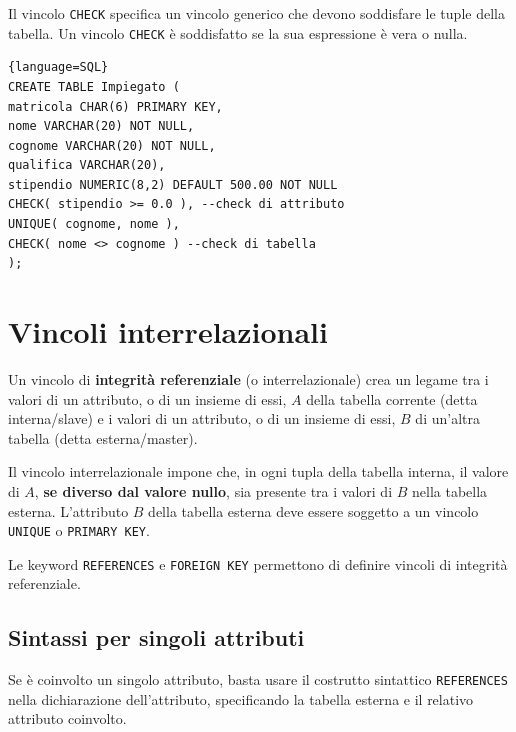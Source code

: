 \documentclass[11pt]{report}
\begin{document}
Il vincolo \texttt{CHECK} specifica un vincolo generico che devono soddisfare le tuple della tabella. Un vincolo \texttt{CHECK} è soddisfatto se la sua espressione è vera o nulla.

\begin{lstlisting}{language=SQL}
CREATE TABLE Impiegato (
matricola CHAR(6) PRIMARY KEY,
nome VARCHAR(20) NOT NULL,
cognome VARCHAR(20) NOT NULL,
qualifica VARCHAR(20),
stipendio NUMERIC(8,2) DEFAULT 500.00 NOT NULL
CHECK( stipendio >= 0.0 ), --check di attributo
UNIQUE( cognome, nome ),
CHECK( nome <> cognome ) --check di tabella
);
\end{lstlisting}

\section{Vincoli interrelazionali}

Un vincolo di \textbf{integrità referenziale} (o interrelazionale) crea un legame tra i valori di un attributo, o di un insieme di essi, $A$ della tabella corrente (detta interna/slave) e i valori di un attributo, o di un insieme di essi, $B$ di un'altra tabella (detta esterna/master).

Il vincolo interrelazionale impone che, in ogni tupla della tabella interna, il valore di $A$, \textbf{se diverso dal valore nullo}, sia presente tra i valori di $B$ nella tabella esterna.
L'attributo $B$ della tabella esterna deve essere soggetto a un vincolo \texttt{UNIQUE} o \texttt{PRIMARY KEY}. 


Le keyword \texttt{REFERENCES} e \texttt{FOREIGN KEY} permettono di definire vincoli di integrit\`a referenziale. 

\subsection{Sintassi per singoli attributi}

Se \`e coinvolto un singolo attributo, basta usare il costrutto sintattico \texttt{REFERENCES} nella dichiarazione dell'attributo, specificando la tabella esterna e il relativo attributo coinvolto.
\end{document}
